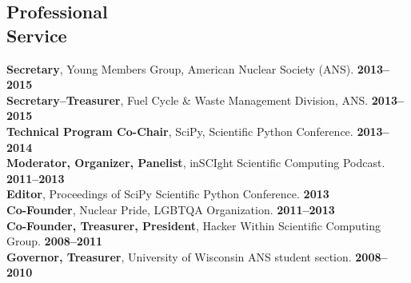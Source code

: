 \documentclass[margin,line]{resume}
\begin{document}
\begin{resume}
    \section{\mysidestyle Professional\\Service}
		\textbf{Secretary}, Young Members Group, American Nuclear Society (ANS). \hfill \textbf{2013--2015}\vspace{.5mm}\\%
		\textbf{Secretary--Treasurer}, Fuel Cycle \& Waste Management Division, ANS. \hfill \textbf{2013--2015}\vspace{.5mm}\\%
		\textbf{Technical Program Co-Chair}, SciPy, Scientific Python Conference.  \hfill \textbf{2013--2014}\vspace{.5mm}\\%
		\textbf{Moderator, Organizer, Panelist}, inSCIght Scientific Computing Podcast. \hfill \textbf{2011--2013}\vspace{.5mm}\\%
		\textbf{Editor}, Proceedings of SciPy Scientific Python Conference.  \hfill \textbf{2013}\vspace{.5mm}\\%
		\textbf{Co-Founder}, Nuclear Pride, LGBTQA Organization. \hfill \textbf{2011--2013}\vspace{.5mm}\\%
		\textbf{Co-Founder, Treasurer, President}, Hacker Within Scientific Computing Group. \hfill \textbf{2008--2011}\vspace{.5mm}\\%
		\textbf{Governor, Treasurer}, University of Wisconsin ANS student section. \hfill \textbf{2008--2010}\vspace{.5mm}\\%

%   
%  
%  
%  
%  
%  
%  
\end{resume}
\end{document}
